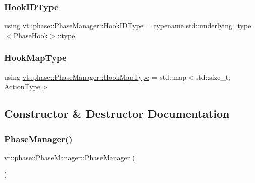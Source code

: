 \mbox{\label{structvt_1_1phase_1_1_phase_manager_a552ed398953e67cd97c440a7f39a8a6c}} 
\subsubsection{\texorpdfstring{Hook\+I\+D\+Type}{HookIDType}}
{\footnotesize\ttfamily using \hyperlink{structvt_1_1phase_1_1_phase_manager_a552ed398953e67cd97c440a7f39a8a6c}{vt\+::phase\+::\+Phase\+Manager\+::\+Hook\+I\+D\+Type} =  typename std\+::underlying\+\_\+type$<$\hyperlink{namespacevt_1_1phase_aec9a63fdd99680d7a7fe99d321193811}{Phase\+Hook}$>$\+::type}

\mbox{\label{structvt_1_1phase_1_1_phase_manager_aa8583887716955f4bd4f438bc26141e9}} 
\subsubsection{\texorpdfstring{Hook\+Map\+Type}{HookMapType}}
{\footnotesize\ttfamily using \hyperlink{structvt_1_1phase_1_1_phase_manager_aa8583887716955f4bd4f438bc26141e9}{vt\+::phase\+::\+Phase\+Manager\+::\+Hook\+Map\+Type} =  std\+::map$<$std\+::size\+\_\+t, \hyperlink{namespacevt_ae0a5a7b18cc99d7b732cb4d44f46b0f3}{Action\+Type}$>$}



\subsection{Constructor \& Destructor Documentation}
\mbox{\label{structvt_1_1phase_1_1_phase_manager_a981990f9f44c00334f80be2e4eb604f5}} 
\subsubsection{\texorpdfstring{Phase\+Manager()}{PhaseManager()}}
{\footnotesize\ttfamily vt\+::phase\+::\+Phase\+Manager\+::\+Phase\+Manager (\begin{DoxyParamCaption}{ }\end{DoxyParamCaption})}



